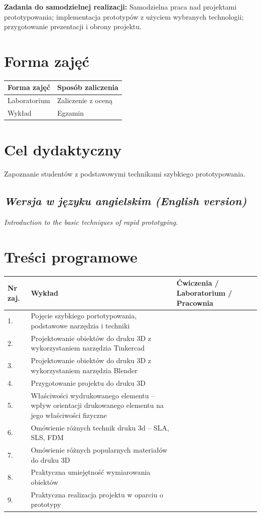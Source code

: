 \documentclass[12pt, a4paper]{article}
\begin{document}
\vspace{4pt}
\noindent\textbf{Zadania do samodzielnej realizacji:} Samodzielna praca nad projektami prototypowania; implementacja prototypów z użyciem wybranych technologii; przygotowanie prezentacji i obrony projektu.

\section{Forma zajęć}

\begin{tabular}{ll}
  \hline
  \textbf{Forma zajęć} & \textbf{Sposób zaliczenia} \\
  \hline
  Laboratorium & Zaliczenie z oceną \\
  Wykład & Egzamin \\
  \hline
\end{tabular}

\section{Cel dydaktyczny}

Zapoznanie studentów z podstawowymi technikami szybkiego prototypowania.

\subsection*{\textit{Wersja w języku angielskim (English version)}}

\textit{Introduction to the basic techniques of rapid prototyping.}


\section{Treści programowe}

\begin{longtable}{|p{1.5cm}|p{6.5cm}|p{6.5cm}|}
\hline
\textbf{Nr zaj.} & \textbf{Wykład} & \textbf{Ćwiczenia / Laboratorium / Pracownia} \\\hline
\endhead
  \hline
  1. & Pojęcie szybkiego portotypowania, podstawowe narzędzia i techniki &  \\
  \hline
  2. & Projektowanie obiektów do druku 3D z wykorzystaniem narzędzia Tinkercad &  \\
  \hline
  3. & Projektowanie obiektów do druku 3D z wykorzystaniem narzędzia Blender &  \\
  \hline
  4. & Przygotowanie projektu do druku 3D &  \\
  \hline
  5. & Właściwości wydrukowanego elementu – wpływ orientacji drukowanego elementu na jego właściwości fizyczne &  \\
  \hline
  6. & Omówienie różnych technik druku 3d – SLA, SLS, FDM &  \\
  \hline
  7. & Omówienie różnych popularnych materiałów do druku 3D &  \\
  \hline
  8. & Praktyczna umiejętność wymiarowania obiektów &  \\
  \hline
  9. & Praktyczna realizacja projektu w oparciu o prototypy &  \\
  \hline
\end{longtable}
\end{document}
